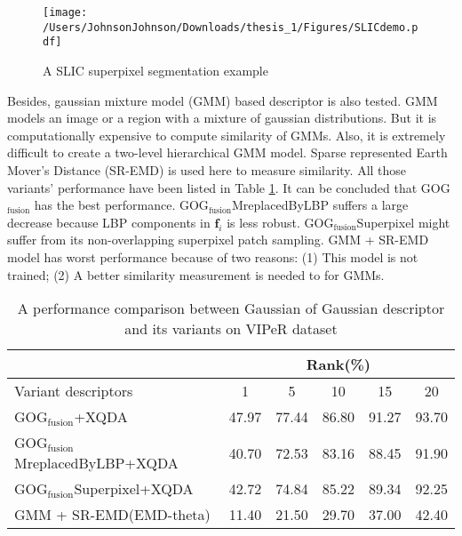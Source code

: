 \begin{figure}[H]
\begin{raggedleft}
\texttt{[image: /Users/JohnsonJohnson/Downloads/thesis\_1/Figures/SLICdemo.pdf]}
\vspace{-3em}
\caption{A SLIC superpixel segmentation example}
\label{SLICdemoCUHK}
\end{raggedleft}
\end{figure}

Besides, gaussian mixture model (GMM) based descriptor is also tested. GMM models an image or a region with a mixture of gaussian distributions. But it is computationally expensive to compute similarity of GMMs. Also, it is extremely difficult to create a two-level hierarchical GMM model. Sparse represented Earth Mover's Distance (SR-EMD) \cite{novelEMD} is used here to measure similarity. All those variants' performance have been listed in Table \ref{VariantsComparison}. It can be concluded that GOG$_\text{fusion}$ has the best performance. GOG$_\text{fusion}$MreplacedByLBP suffers a large decrease because LBP components in $\bm{f}_i$ is less robust. GOG$_\text{fusion}$Superpixel might suffer from its non-overlapping superpixel patch sampling. GMM + SR-EMD model has worst performance because of two reasons: (1) This model is not trained; (2) A better similarity measurement is needed to for GMMs.
\begin{table}[H]
\centering
\caption{A performance comparison between Gaussian of Gaussian descriptor and its variants on VIPeR dataset}
\label{VariantsComparison}
\begin{tabular}{|l|c|c|c|c|c|}
\hline
& \multicolumn{5}{|c|}{Rank(\%)}\\
\hline
Variant descriptors & 1&5&10&15&20\\
\hline
GOG$_\text{fusion}$+XQDA & 47.97& 77.44&86.80 &91.27 &93.70 \\ 
\hline
GOG$_\text{fusion}$MreplacedByLBP+XQDA & 40.70&72.53 &83.16 &88.45 &91.90 \\ %
\hline
GOG$_\text{fusion}$Superpixel+XQDA &42.72 &74.84 & 85.22&89.34& 92.25\\ %
\hline
GMM + SR-EMD(EMD-theta) &11.40 &21.50 &29.70 &37.00 &42.40 \\ %
\hline
\end{tabular}
\end{table}



